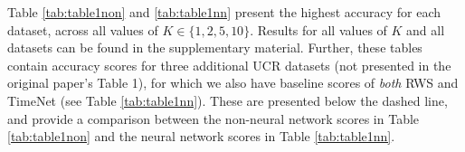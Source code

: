 Table \ref{tab:table1non} and \ref{tab:table1nn} present the highest accuracy  for each dataset, across all values of $K \in \{1,2,5,10\}$. Results for all values of $K$ and all datasets can be found in the supplementary material.
Further, these tables contain accuracy scores for three additional UCR datasets (not presented in the original paper's Table 1), for which we also have baseline scores of \textit{both} RWS and TimeNet (see Table \ref{tab:table1nn}). These are presented below the dashed line, and provide a comparison between the non-neural network scores in Table \ref{tab:table1non} and the neural network scores in Table \ref{tab:table1nn}.



